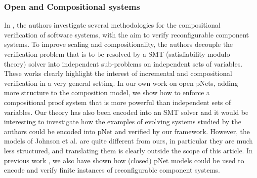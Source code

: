 \documentclass{lmcs}
\newcommand{\TODO}[1]{\textcolor{red}{\textbf{[TODO:#1]}}}
\begin{document}

\subsubsection*{Open and Compositional systems}
In
\cite{Johnson:2013:CBSE,Johnson:2014:qosa}, the authors investigate several methodologies for the compositional verification of software systems, with the aim to verify reconfigurable component systems. To improve scaling and compositionality, the authors  decouple the verification problem that is to be resolved by a SMT (satisfiability modulo theory) solver into independent sub-problems on independent sets of variables. These works clearly highlight the interest of incremental and compositional verification in a very general setting. In our own work on open pNets, adding more structure to the composition model, we show how to enforce a compositional proof system that is more powerful than independent sets of variables. Our theory has also been encoded into an SMT solver and it would be interesting to investigate how the examples of evolving systems studied by the authors could be encoded into pNet and verified by our framework. However, the models of Johnson et al. are quite different from ours, in particular they are much less structured, and translating them is clearly outside the scope of this article.
In previous work \cite{gaspar:hal-00916115}, we also have shown how (closed) pNet models could be used to encode and verify finite instances of reconfigurable component systems. 

\end{document}
